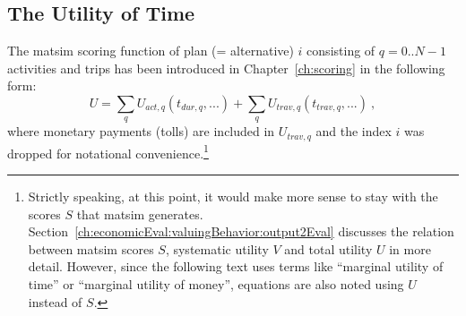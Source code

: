 \subsection{The Utility of Time}
\label{sec:scor-funct-revisited}
%
%
The \acrshort{matsim} scoring function of plan (= alternative) $i$ consisting of $q = 0..N-1$ activities and trips has been introduced in Chapter~\ref{ch:scoring} in the following form:\
\begin{equation}
U = \sum_q U_{act,q}(t_{dur,q}, ...) + \sum_q U_{trav,q}(t_{trav,q}, ...) 
%
\ ,
\label{eq:scoring-fct-revisited}
\end{equation}
where monetary payments (\eg tolls) are included in $U_{trav,q}$ and the index $i$ was dropped for notational convenience.\footnote{%
%
Strictly speaking, at this point, it would make more sense to stay with the scores $S$ that \gls{matsim} generates.  Section~\ref{ch:economicEval:valuingBehavior:output2Eval} discusses the relation between \gls{matsim} scores $S$, systematic utility $V$ and total utility $U$ in more detail.
However, since the following text uses terms like ``marginal utility of time'' or ``marginal utility of money'', equations are also noted using $U$ instead of $S$. 
%
}


